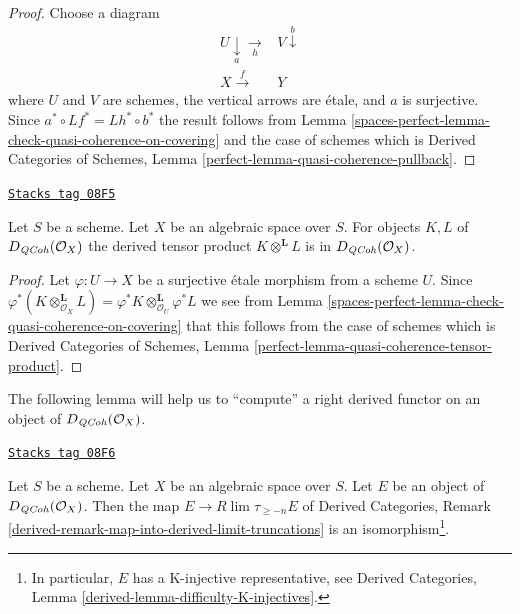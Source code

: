 \begin{proof}
Choose a diagram
$$
\begin{array}{cc}U \underset{a}{\downarrow}\underset{h}{\longrightarrow} & V \overset{b}{\downarrow} \\ X \overset{f}{\longrightarrow} & Y\end{array}
$$
where $U$ and $V$ are schemes, the vertical arrows are \'etale, and
$a$ is surjective. Since $a^* \circ Lf^* = Lh^* \circ b^*$ the result
follows from
Lemma \ref{spaces-perfect-lemma-check-quasi-coherence-on-covering}
and the case of schemes which is
Derived Categories of Schemes, Lemma
\ref{perfect-lemma-quasi-coherence-pullback}.
\end{proof}

\begin{lemma}
\label{spaces-perfect-lemma-quasi-coherence-tensor-product}
\href{https://stacks.math.columbia.edu/tag/08F5}{\texttt{Stacks tag 08F5}}

Let $S$ be a scheme. Let $X$ be an algebraic space over $S$.
For objects $K, L$ of $D_{\mathit{QCoh}}(\mathcal{O}_X)$
the derived tensor product $K \otimes^\mathbf{L} L$ is in
$D_{\mathit{QCoh}}(\mathcal{O}_X)$.
\end{lemma}

\begin{proof}
Let $\varphi : U \to X$ be a surjective \'etale morphism from a scheme $U$.
Since
$\varphi^*(K \otimes_{\mathcal{O}_X}^\mathbf{L} L) =
\varphi^*K \otimes_{\mathcal{O}_U}^\mathbf{L} \varphi^*L$
we see from
Lemma \ref{spaces-perfect-lemma-check-quasi-coherence-on-covering}
that this follows from the case of schemes which is
Derived Categories of Schemes, Lemma
\ref{perfect-lemma-quasi-coherence-tensor-product}.
\end{proof}

The following lemma will help us to ``compute'' a right derived functor
on an object of $D_{\mathit{QCoh}}(\mathcal{O}_X)$.

\begin{lemma}
\label{spaces-perfect-lemma-nice-K-injective}
\href{https://stacks.math.columbia.edu/tag/08F6}{\texttt{Stacks tag 08F6}}

Let $S$ be a scheme. Let $X$ be an algebraic space over $S$. Let $E$ be an
object of $D_{\mathit{QCoh}}(\mathcal{O}_X)$. Then the map
$E \to R\lim \tau_{\geq -n}E$ of
Derived Categories, Remark
\ref{derived-remark-map-into-derived-limit-truncations}
is an isomorphism\footnote{In particular,
$E$ has a K-injective representative, see
Derived Categories, Lemma \ref{derived-lemma-difficulty-K-injectives}.}.
\end{lemma}

